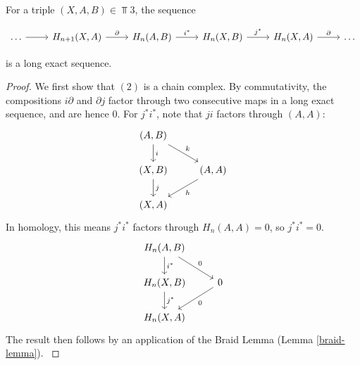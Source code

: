 \begin{prop}
For a triple $(X,A,B)\in \Top{3}$, the sequence

\[\begin{tikzcd}
\dots \arrow[r] & {H_{n+1}(X,A)} \arrow[r, "\partial"] & {H_n(A,B)} \arrow[r, "i^*"] & {H_n(X,B)} \arrow[r, "j^*"] & {H_n(X,A)} \arrow[r, "\partial"] & \dots
\end{tikzcd}\]


is a long exact sequence.
\end{prop}
\begin{proof}
We first show that $(2)$ is a chain complex. By commutativity, the compositions $i\partial$ and $\partial j$ factor through two consecutive maps in a long exact sequence, and are hence $0$. For $j^*i^*$, note that $ji$ factors through $(A,A)$:
\[\begin{tikzcd}
{(A,B)} \arrow[d, "i"] \arrow[rd, "k"] &                         \\
{(X,B)} \arrow[d, "j"]                 & {(A,A)} \arrow[ld, "h"] \\
{(X,A)}                                &                        
\end{tikzcd}\]
In homology, this means $j^*i^*$ factors through $H_n(A,A)=0$, so $j^*i^*=0$.
\[\begin{tikzcd}
{H_n(A,B)} \arrow[d, "i^*"] \arrow[rd, "0"] &                   \\
{H_n(X,B)} \arrow[d, "j^*"]                 & 0 \arrow[ld, "0"] \\
{H_n(X,A)}                                  &                  
\end{tikzcd}\]
The result then follows by an application of the Braid Lemma (Lemma \ref{braid-lemma}).
\cite{Werndli}
\end{proof}

